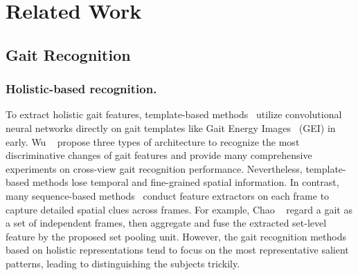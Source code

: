 \documentclass[runningheads]{llncs}
\begin{document}
    

    
\section{Related Work}

\subsection{Gait Recognition}


    \subsubsection{Holistic-based recognition.} To extract holistic gait features, template-based methods~\cite{shiraga2016geinet,wu2016comprehensive} utilize convolutional neural networks directly on gait templates like Gait Energy Images~\cite{han2005gei} (GEI) in early. Wu \etal~\cite{wu2016comprehensive} propose three types of architecture to recognize the most discriminative changes of gait features and provide many comprehensive experiments on cross-view gait recognition performance. Nevertheless, template-based methods lose temporal and fine-grained spatial information. In contrast, many sequence-based methods~\cite{aaai2019gaitset,gln,pami2020gaitnet} conduct feature extractors on each frame to capture detailed spatial clues across frames. For example, Chao \etal~\cite{aaai2019gaitset} regard a gait as a set of independent frames, then aggregate and fuse the extracted set-level feature by the proposed set pooling unit. However, the gait recognition methods based on holistic representations tend to focus on the most representative salient patterns, leading to distinguishing the subjects trickily.
    
\end{document}
